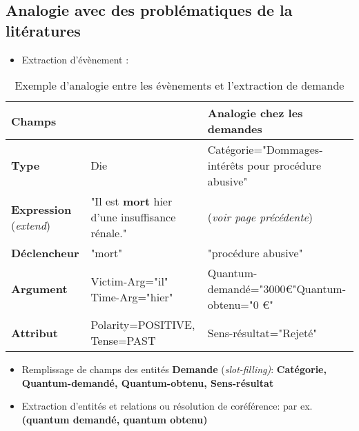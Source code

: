 \subsection{Analogie avec des problématiques de la litératures}
\begin{itemize}
\item Extraction d'évènement : 
\end{itemize}
\begin{table}[h]
\small
\begin{tabular}{|p{}|p{}|p{}|}
\hline
\textbf{Champs} & \textbf{\cite{ace2005event}} & \textbf{Analogie chez les demandes} \\ \hline
\textbf{Type} &  Die & Catégorie="Dommages-intérêts pour procédure abusive" \\ \hline
\textbf{Expression} (\textit{extend}) & "Il est \textbf{mort} hier d'une insuffisance rénale."  & (\textit{voir page précédente}) \\ \hline
\textbf{Déclencheur} & "mort" & "procédure abusive"\\ \hline
\textbf{Argument} & Victim-Arg="il" \linebreak Time-Arg="hier"  & Quantum-demandé="3000\euro{}"\linebreak  Quantum-obtenu="0 \euro{}"\ \\ \hline
\textbf{Attribut} & Polarity=POSITIVE, Tense=PAST & Sens-résultat="Rejeté" \\ \hline
\end{tabular}
\caption{Exemple d'analogie entre les évènements et l'extraction de demande}
\end{table}
\begin{itemize}
\item Remplissage de champs des entités \textbf{Demande} (\textit{slot-filling)}: \textbf{Catégorie, Quantum-demandé, Quantum-obtenu, Sens-résultat}
\item Extraction d'entités et relations ou résolution de coréférence: par ex. \textbf{(quantum demandé, quantum obtenu)}
\end{itemize}

